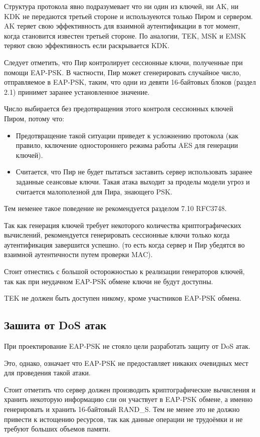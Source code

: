 Структура протокола явно подразумевает что ни один из ключей, ни AK, ни KDK не передаются третьей стороне и используеются только Пиром и сервером. AK теряет свою эффективность для взаимной аутентификации в тот момент, когда становится известен третьей стороне. По аналогии, TEK, MSK и EMSK теряют свою эффективность если раскрывается KDK.

Следует отметить, что Пир контролирует сессионные ключи, полученные при помощи EAP-PSK. В частности, Пир может сгенерировать случайное число, отправляемое в EAP-PSK, таким, что одни из девяти 16-байтовых блоков (раздел 2.1)  принимет заранее установленное значение.

Число выбирается без предотвращения этого контроля сессионных ключей Пиром, потому что:

\begin{itemize}
\item Предотвращение такой ситуации приведет к усложнению протокола (как правило, кключение одностороннего режима работы AES для генерации ключей).
\item Считается, что Пир не будет пытаться заставить сервер использовать заранее заданные сеансовые ключи. Такая атака выходит за проделы модели угроз и считается малополезной для Пира, знающего PSK.
\end{itemize}

Тем неменее такое поведение не рекомендуется разделом 7.10 RFC3748.

Так как генерация ключей требует некоторого количества криптографических вычислений, рекомендуется генерировать сессионные ключи только когда аутентификация завершится успешно. (то есть когда сервер и Пир убедятся во взаимной аутентичности путем проверки MAC).

Стоит отнестись с большой осторожностью к реализации генераторов ключей, так как при неудачном EAP-PSK обмене ключи не будут доступны.

TEK не должен быть доступен никому, кроме участников EAP-PSK обмена.

\subsection{Зашита от DoS атак}

При проектирование EAP-PSK не стояло цели разработать защиту от DoS атак.

Это, однако, означает что EAP-PSK не предоставляет никаких очевидных мест для проведения такой атаки.

Стоит отметить что сервер должен производить криптографические вычисления и хранить некоторую информацию сли он участвует в EAP-PSK обмене, а именно генерировать и хранить 16-байтовый RAND\_S. Тем не менее это не должно привести к истощению ресурсов, так как данные операции не трудоёмки и не требуют больших объемов памяти.

